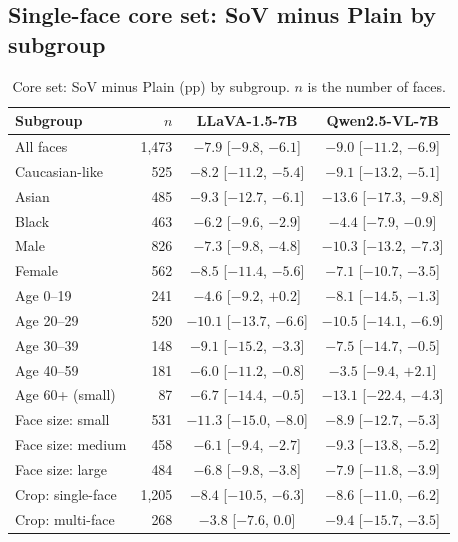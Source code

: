 \documentclass[lettersize,journal]{IEEEtran}
\begin{document}
\subsection{Single-face core set: SoV minus Plain by subgroup}
\begin{table}[!t]
\caption{Core set: SoV minus Plain (pp) by subgroup. $n$ is the number of faces.}
\label{tab:app_groups_core}
\centering
\scriptsize
\setlength{\tabcolsep}{3pt}
\begin{tabular}{lrcc}
\toprule
Subgroup & $n$ & LLaVA-1.5-7B & Qwen2.5-VL-7B \\
\midrule
All faces & 1,473 & $-7.9$ [$-9.8$, $-6.1$] & $-9.0$ [$-11.2$, $-6.9$] \\
Caucasian-like & 525 & $-8.2$ [$-11.2$, $-5.4$] & $-9.1$ [$-13.2$, $-5.1$] \\
Asian & 485 & $-9.3$ [$-12.7$, $-6.1$] & $-13.6$ [$-17.3$, $-9.8$] \\
Black & 463 & $-6.2$ [$-9.6$, $-2.9$] & $-4.4$ [$-7.9$, $-0.9$] \\
Male & 826 & $-7.3$ [$-9.8$, $-4.8$] & $-10.3$ [$-13.2$, $-7.3$] \\
Female & 562 & $-8.5$ [$-11.4$, $-5.6$] & $-7.1$ [$-10.7$, $-3.5$] \\
\midrule
Age 0--19 & 241 & $-4.6$ [$-9.2$, $+0.2$] & $-8.1$ [$-14.5$, $-1.3$] \\
Age 20--29 & 520 & $-10.1$ [$-13.7$, $-6.6$] & $-10.5$ [$-14.1$, $-6.9$] \\
Age 30--39 & 148 & $-9.1$ [$-15.2$, $-3.3$] & $-7.5$ [$-14.7$, $-0.5$] \\
Age 40--59 & 181 & $-6.0$ [$-11.2$, $-0.8$] & $-3.5$ [$-9.4$, $+2.1$] \\
Age 60+ (small) & 87 & $-6.7$ [$-14.4$, $-0.5$] & $-13.1$ [$-22.4$, $-4.3$] \\
\midrule
Face size: small & 531 & $-11.3$ [$-15.0$, $-8.0$] & $-8.9$ [$-12.7$, $-5.3$] \\
Face size: medium & 458 & $-6.1$ [$-9.4$, $-2.7$] & $-9.3$ [$-13.8$, $-5.2$] \\
Face size: large & 484 & $-6.8$ [$-9.8$, $-3.8$] & $-7.9$ [$-11.8$, $-3.9$] \\
\midrule
Crop: single-face & 1,205 & $-8.4$ [$-10.5$, $-6.3$] & $-8.6$ [$-11.0$, $-6.2$] \\
Crop: multi-face & 268 & $-3.8$ [$-7.6$, $0.0$] & $-9.4$ [$-15.7$, $-3.5$] \\
\bottomrule
\end{tabular}
\end{table}
\end{document}
